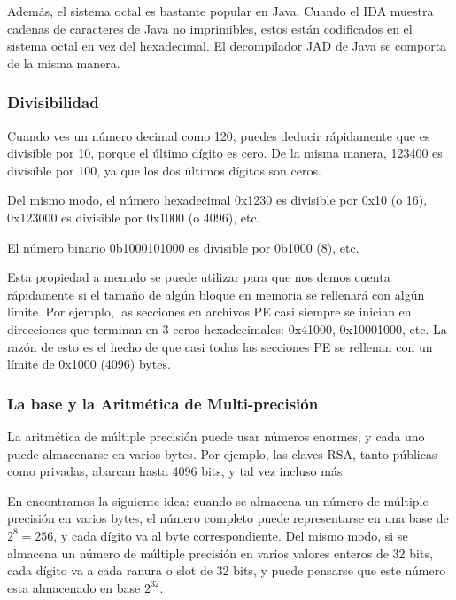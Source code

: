 Además, el sistema octal es bastante popular en Java. Cuando el IDA muestra cadenas de caracteres de Java no imprimibles,
estos están codificados en el sistema octal en vez del hexadecimal.
El decompilador JAD de Java se comporta de la misma manera.

\subsubsection{Divisibilidad}

Cuando ves un número decimal como 120, puedes deducir rápidamente que es divisible por 10, porque el último dígito es cero.
De la misma manera, 123400 es divisible por 100, ya que los dos últimos dígitos son ceros.

Del mismo modo, el número hexadecimal 0x1230 es divisible por 0x10 (o 16), 0x123000 es divisible por 0x1000 (o 4096), etc.

El número binario 0b1000101000 es divisible por 0b1000 (8), etc.

Esta propiedad a menudo se puede utilizar para que nos demos cuenta rápidamente si el tamaño de algún bloque en memoria se rellenará con algún límite.
Por ejemplo, las secciones en archivos \ac {PE} casi siempre se inician en direcciones que terminan en 3 ceros hexadecimales: 0x41000, 0x10001000, etc.
La razón de esto es el hecho de que casi todas las secciones \ac{PE} se rellenan con un límite de 0x1000 (4096) bytes.

\subsubsection{La base y la Aritmética de  Multi-precisión }

La aritmética de  múltiple precisión puede usar números enormes, y cada uno puede almacenarse en varios bytes.
Por ejemplo, las claves RSA, tanto públicas como privadas, abarcan hasta 4096 bits, y tal vez incluso más.

En  encontramos la siguiente idea: cuando se almacena un número de  múltiple precisión en varios bytes,
el número completo puede representarse en una base de $ 2 ^ 8 = 256 $, y cada dígito va al byte correspondiente.
Del mismo modo, si se almacena un número de múltiple precisión en varios valores enteros de 32 bits, cada dígito va a cada ranura o slot de 32 bits,
y puede pensarse que este número esta almacenado en base $ 2 ^ {32} $.

